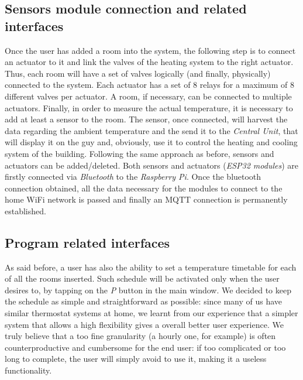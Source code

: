 \documentclass[a4paper]{article}
\begin{document}
        \subsection{Sensors module connection and related interfaces}
        Once the user has added a room into the system, the following step is to connect an actuator to it and link the valves of the heating system to the right actuator. Thus, each room will have a set of valves logically (and finally, physically) connected to the system. Each actuator has a set of 8 relays for a maximum of 8 different valves per actuator. A room, if necessary, can be connected to multiple actuators. Finally, in order to measure the actual temperature, it is necessary to add at least a sensor to the room. The sensor, once connected, will harvest the data regarding the ambient temperature and the send it to the \emph{Central Unit}, that will display it on the guy and, obviously, use it to control the heating and cooling system of the building.
        Following the same approach as before, sensors and actuators can be added/deleted.
        Both sensors and actuators (\emph{ESP32 modules}) are firstly connected via \emph{Bluetooth} to the \emph{Raspberry Pi}. Once the bluetooth connection obtained, all the data necessary for the modules to connect to the home WiFi network is passed and finally an MQTT connection is permanently established.

        \subsection{Program related interfaces}
        As said before, a user has also the ability to set a temperature timetable for each of all the rooms inserted.
        Such schedule will be activated only when the user desires to, by tapping on the \emph{P} button in the main window.
        We decided to keep the schedule as simple and straightforward as possible: since many of us have similar thermostat systems at home, we learnt from our experience that a simpler system that allows a high flexibility gives a overall better user experience.
        We truly believe that a too fine granularity (a hourly one, for example) is often counterproductive and cumbersome for the end user: if too complicated or too long to complete, the user will simply avoid to use it, making it a useless functionality.
\end{document}
